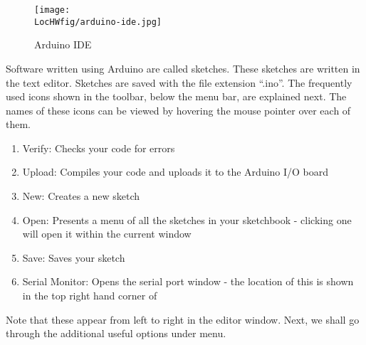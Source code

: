 \begin{figure}
      \centering
      \texttt{[image: \\LocHWfig/arduino-ide.jpg]}
      \caption{Arduino IDE}
      \label{ard-ide}
\end{figure}
Software written using Arduino are called sketches. These sketches are
written in the text editor. Sketches are saved with the file extension
``.ino''. The frequently used icons shown in the toolbar, below the menu bar, are explained next. The names of these icons can be viewed by hovering the mouse pointer over each of them.

\begin{enumerate}
      \item Verify: Checks your code for errors
      \item Upload: Compiles your code and uploads it to the Arduino I/O
            board
      \item New: Creates a new sketch
      \item Open: Presents a menu of all the sketches in your
            sketchbook - clicking one will open it within the current window
      \item Save: Saves your sketch
      \item Serial Monitor: Opens the serial port window - the location of
            this is shown in the top right hand corner of 
\end{enumerate}
Note that these appear from left to right in the editor window. Next, we shall go through the additional useful options under menu.
